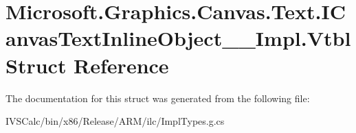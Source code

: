 \hypertarget{struct_microsoft_1_1_graphics_1_1_canvas_1_1_text_1_1_i_canvas_text_inline_object_____impl_1_1_vtbl}{}\section{Microsoft.\+Graphics.\+Canvas.\+Text.\+I\+Canvas\+Text\+Inline\+Object\+\_\+\+\_\+\+Impl.\+Vtbl Struct Reference}
\label{struct_microsoft_1_1_graphics_1_1_canvas_1_1_text_1_1_i_canvas_text_inline_object_____impl_1_1_vtbl}


The documentation for this struct was generated from the following file\+:\begin{DoxyCompactItemize}
\item 
I\+V\+S\+Calc/bin/x86/\+Release/\+A\+R\+M/ilc/Impl\+Types.\+g.\+cs\end{DoxyCompactItemize}
